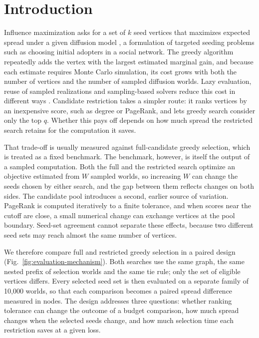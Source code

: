 \documentclass[smallextended]{svjour3}
\begin{document}
\section{Introduction}
Influence maximization asks for a set of $k$ seed vertices that maximizes expected spread under a given diffusion model \cite{ref1}, a formulation of targeted seeding problems such as choosing initial adopters in a social network. The greedy algorithm repeatedly adds the vertex with the largest estimated marginal gain, and because each estimate requires Monte Carlo simulation, its cost grows with both the number of vertices and the number of sampled diffusion worlds. Lazy evaluation, reuse of sampled realizations and sampling-based solvers reduce this cost in different ways \cite{ref7,ref8,ref2}. Candidate restriction takes a simpler route: it ranks vertices by an inexpensive score, such as degree or PageRank, and lets greedy search consider only the top $q$. Whether this pays off depends on how much spread the restricted search retains for the computation it saves.

That trade-off is usually measured against full-candidate greedy selection, which is treated as a fixed benchmark. The benchmark, however, is itself the output of a sampled computation. Both the full and the restricted search optimize an objective estimated from $W$ sampled worlds, so increasing $W$ can change the seeds chosen by either search, and the gap between them reflects changes on both sides. The candidate pool introduces a second, earlier source of variation. PageRank is computed iteratively to a finite tolerance, and when scores near the cutoff are close, a small numerical change can exchange vertices at the pool boundary. Seed-set agreement cannot separate these effects, because two different seed sets may reach almost the same number of vertices.

We therefore compare full and restricted greedy selection in a paired design (Fig.~\ref{fig:evaluation-mechanism}). Both searches use the same graph, the same nested prefix of selection worlds and the same tie rule; only the set of eligible vertices differs. Every selected seed set is then evaluated on a separate family of 10,000 worlds, so that each comparison becomes a paired spread difference measured in nodes. The design addresses three questions: whether ranking tolerance can change the outcome of a budget comparison, how much spread changes when the selected seeds change, and how much selection time each restriction saves at a given loss.
\end{document}
